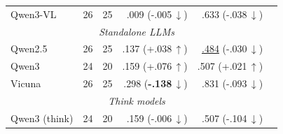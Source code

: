 \begin{table}[t]
{\begin{tabular}{lrrrrr}
Qwen3-VL & 26 & 25 & .009 (\textcolor[HTML]{0072B2}{-.005\,$\downarrow$}) & .633 (\textcolor[HTML]{0072B2}{-.038\,$\downarrow$}) \\
\multicolumn{5}{c}{\textit{Standalone LLMs}} \\
\midrule
Qwen2.5 & 26 & 25 & .137 (\textcolor[HTML]{CC7A00}{+.038\,$\uparrow$}) & \underline{.484} (\textcolor[HTML]{0072B2}{-.030\,$\downarrow$}) \\
Qwen3 & 24 & 20 & .159 (\textcolor[HTML]{CC7A00}{+.076\,$\uparrow$}) & .507 (\textcolor[HTML]{CC7A00}{+.021\,$\uparrow$}) \\
Vicuna & 26 & 25 & .298 (\textcolor[HTML]{0072B2}{\textbf{-.138}\,$\downarrow$}) & .831 (\textcolor[HTML]{0072B2}{-.093\,$\downarrow$}) \\
\multicolumn{5}{c}{\textit{Think models}} \\
\midrule
Qwen3 (think) & 24 & 20 & .159 (\textcolor[HTML]{0072B2}{-.006\,$\downarrow$}) & .507 (\textcolor[HTML]{0072B2}{-.104\,$\downarrow$}) \\
\bottomrule
\end{tabular}%
}
\end{table}
